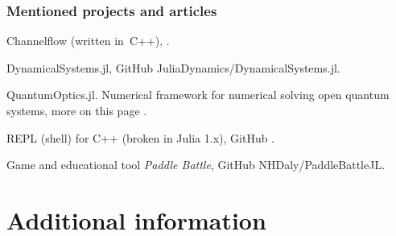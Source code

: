 \documentclass[10pt,t]{beamer}
\begin{document}
\begin{frame}
  \frametitle{Mentioned projects and articles}


  Channelflow (written in~C++),
  .

  DynamicalSystems.jl, GitHub
  {JuliaDynamics/DynamicalSystems.jl}.

  QuantumOptics.jl. Numerical framework for numerical
  solving open quantum systems, more on this page
  .

  REPL (shell) for C++ (broken in Julia 1.x), GitHub
  .

  Game and educational tool \textit{Paddle Battle}, GitHub
  {NHDaly/PaddleBattleJL}.

\end{frame}










\section{Additional information}
\end{document}

